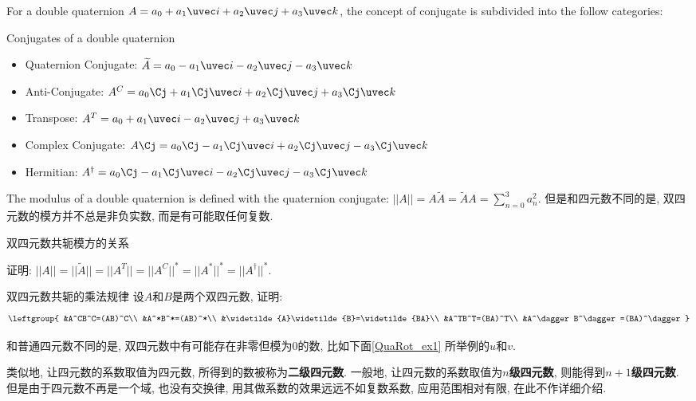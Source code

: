 For a double quaternion $A=a_0+a_1 \uvec i+a_2\uvec j+a_3\uvec k$, the concept of conjugate is subdivided into the follow categories: 

\begin{definition}{Conjugates of a double quaternion}
\begin{itemize}
\item Quaternion Conjugate: $\widetilde{A}=a_0-a_1\uvec i-a_2\uvec j-a_3\uvec k$
\item Anti-Conjugate: $A^C=a_0\Cj + a_1\Cj\uvec i+a_2\Cj\uvec j+a_3\Cj\uvec k$
\item Transpose: $A^T=a_0+a_1\uvec i-a_2\uvec j+a_3\uvec k$
\item Complex Conjugate: $A\Cj=a_0\Cj-a_1\Cj\uvec i+a_2\Cj\uvec j-a_3\Cj\uvec k$
\item Hermitian: $A^\dagger=a_0\Cj-a_1\Cj\uvec i-a_2\Cj\uvec j-a_3\Cj\uvec k$
\end{itemize}
\end{definition}

The modulus of a double quaternion is defined with the quaternion conjugate: $||A||=A\widetilde{A}=\widetilde{A}A=\sum^{3}_{n=0}a^2_n$. 但是和四元数不同的是, 双四元数的模方并不总是非负实数, 而是有可能取任何复数. 

\begin{exercise}{双四元数共轭模方的关系}

证明: $||A||=||\widetilde{A}||=||A^T||=||A^C||^*=||A^*||^*=||A^\dagger||^*$. 

\end{exercise}

\begin{exercise}{双四元数共轭的乘法规律}
设$A$和$B$是两个双四元数, 证明: 
\begin{equation}
\leftgroup{
&A^CB^C=(AB)^C\\
&A^*B^*=(AB)^*\\
&\widetilde{A}\widetilde{B}=\widetilde{BA}\\
&A^TB^T=(BA)^T\\
&A^\dagger B^\dagger=(BA)^\dagger
}
\end{equation}

\end{exercise}

和普通四元数不同的是, 双四元数中有可能存在非零但模为0的数, 比如下面\autoref{QuaRot_ex1} 所举例的$u$和$v$. 

类似地, 让四元数的系数取值为四元数, 所得到的数被称为\textbf{二级四元数}. 一般地, 让四元数的系数取值为$n$\textbf{级四元数}, 则能得到$n+1$\textbf{级四元数}. 但是由于四元数不再是一个域, 也没有交换律, 用其做系数的效果远远不如复数系数, 应用范围相对有限, 在此不作详细介绍. 



